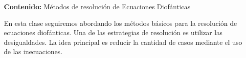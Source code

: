 {\Large\textbf{Contenido:} Métodos de resolución de Ecuaciones Diofánticas}

En esta clase seguiremos abordando los métodos básicos para la resolución de ecuaciones diofánticas.
Una de las estrategias de resolución es utilizar las desigualdades.
La idea principal es reducir la cantidad de casos mediante el uso de las inecuaciones.